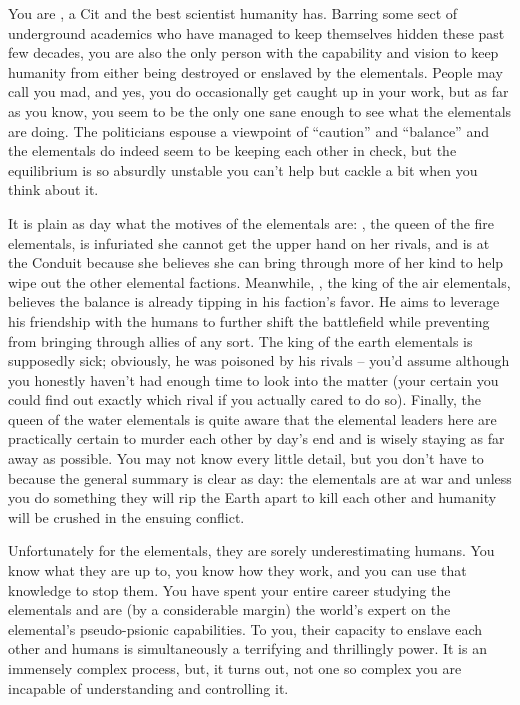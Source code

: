 \documentclass[char]{elementals}
\begin{document}
\name{\cMS{}}

You are \cMS{\intro}, a Cit and the best scientist humanity has. Barring some sect of underground academics who have managed to keep themselves hidden these past few decades, you are also the only person with the capability and vision to keep humanity from either being destroyed or enslaved by the elementals. People may call you mad, and yes, you do occasionally get caught up in your work, but as far as you know, you seem to be the only one sane enough to see what the elementals are doing. The politicians espouse a viewpoint of ``caution'' and ``balance'' and the elementals do indeed seem to be keeping each other in check, but the equilibrium is so absurdly unstable you can't help but cackle a bit when you think about it.


It is plain as day what the motives of the elementals are: \cQueen{\intro}, the queen of the fire elementals, is infuriated she cannot get the upper hand on her rivals, and is at the Conduit because she believes she can bring through more of her kind to help wipe out the other elemental factions. Meanwhile, \cKing{\intro}, the king of the air elementals, believes the balance is already tipping in his faction's favor. He aims to leverage his friendship with the humans to further shift the battlefield while preventing \cQueen{} from bringing through allies of any sort. The king of the earth elementals is supposedly sick; obviously, he was poisoned by his rivals -- you'd assume \cKing{} although you honestly haven't had enough time to look into the matter (your certain you could find out exactly which rival if you actually cared to do so). Finally, the queen of the water elementals is quite aware that the elemental leaders here are practically certain to murder each other by day's end and is wisely staying as far away as possible. You may not know every little detail, but you don't have to because the general summary is clear as day: the elementals are at war and unless you do something they will rip the Earth apart to kill each other and humanity will be crushed in the ensuing conflict.

Unfortunately for the elementals, they are sorely underestimating humans. You know what they are up to, you know how they work, and you can use that knowledge to stop them. You have spent your entire career studying the elementals and are (by a considerable margin) the world's expert on the elemental's pseudo-psionic capabilities. To you, their capacity to enslave each other and humans is simultaneously a terrifying and thrillingly power. It is an immensely complex process, but, it turns out, not one so complex you are incapable of understanding and controlling it. 
\end{document}
